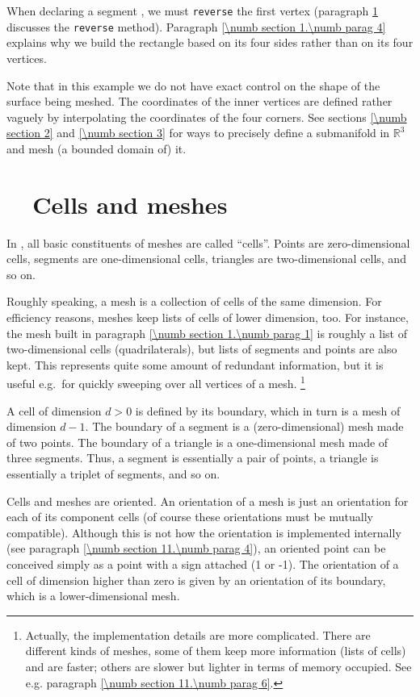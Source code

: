 When declaring a segment {\small\tt {}}, we must {\small\tt reverse} the first vertex
(paragraph \ref{\numb section 1.\numb parag 2} discusses the {\small\tt reverse} method).
Paragraph \ref{\numb section 1.\numb parag 4} explains why we build
the rectangle based on its four sides rather than on its four vertices.

Note that in this example we do not have exact control on the shape of the surface being meshed.
The coordinates of the inner vertices are defined rather vaguely by interpolating the
coordinates of the four corners.
See sections \ref{\numb section 2} and \ref{\numb section 3} for ways to precisely define
a submanifold in $ \mathbb{R}^3 $ and mesh (a bounded domain of) it.


\section{~~Cells and meshes}\label{\numb section 1.\numb parag 2}

In \maniFEM, all basic constituents of meshes are called ``cells''. 
Points are zero-dimensional cells, segments are one-dimensional cells, triangles are
two-dimensional cells, and so on.

Roughly speaking, a mesh is a collection of cells of the same dimension. 
For efficiency reasons, meshes keep lists of cells of lower dimension, too. 
For instance, the mesh built in paragraph \ref{\numb section 1.\numb parag 1} is 
roughly a list of two-dimensional cells (quadrilaterals), but lists of segments and points
are also kept.
This represents quite some amount of redundant information, but it is useful e.g.\ for
quickly sweeping over all vertices of a mesh.%
\footnote {Actually, the implementation details are more complicated.
There are different kinds of meshes, some of them keep more information (lists of cells)
and are faster; others are slower but lighter in terms of memory occupied.
See e.g. paragraph \ref{\numb section 11.\numb parag 6}.}

A cell of dimension $ d>0 $ is defined by its boundary, 
which in turn is a mesh of dimension $ d-1 $. 
The boundary of a segment is a (zero-dimensional) mesh made of two points.
The boundary of a triangle is a one-dimensional mesh made of three segments.
Thus, a segment is essentially a pair of points, a triangle is essentially a triplet of segments, and so on.

Cells and meshes are oriented. 
An orientation of a mesh is just an orientation for each of its component cells
(of course these orientations must be mutually compatible).
Although this is not how the orientation is implemented internally
(see paragraph \ref{\numb section 11.\numb parag 4}),
an oriented point can be conceived simply as a point with a sign attached (1 or -1). 
The orientation of a cell of dimension higher than zero is given by an orientation
of its boundary, which is a lower-dimensional mesh.

